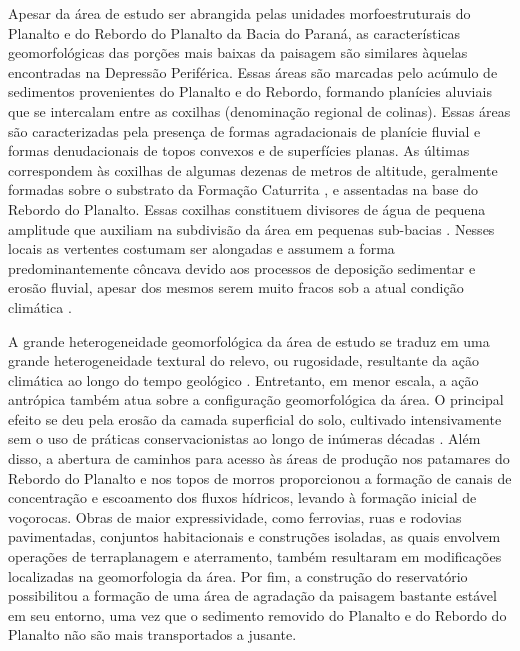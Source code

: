 Apesar da área de estudo ser abrangida pelas unidades morfoestruturais do Planalto e do Rebordo do Planalto
da Bacia do Paraná, as características geomorfológicas das porções mais baixas da paisagem são similares 
àquelas encontradas na Depressão Periférica. Essas áreas são marcadas pelo acúmulo de sedimentos provenientes 
do Planalto e do Rebordo, formando planícies aluviais que se intercalam entre as coxilhas (denominação 
regional de colinas). Essas áreas são caracterizadas pela presença de formas agradacionais de planície fluvial 
e formas denudacionais de topos convexos e de superfícies planas. As últimas correspondem às coxilhas de 
algumas dezenas de metros de altitude, geralmente formadas sobre o substrato da Formação Caturrita 
\cite{GasparettoEtAl1988}, e assentadas na base do Rebordo do Planalto. Essas coxilhas constituem 
divisores de água de pequena amplitude que auxiliam na subdivisão da área em pequenas sub-bacias 
\cite{Marins2004, Sartori2009}. Nesses locais as vertentes costumam ser alongadas e assumem a forma 
predominantemente côncava devido aos processos de deposição sedimentar e erosão fluvial, apesar dos mesmos 
serem muito fracos sob a atual condição climática 
\cite{NascimentoEtAl2010, WerlangEtAl2010}.

A grande heterogeneidade geomorfológica da área de estudo se traduz em uma grande heterogeneidade textural 
do relevo, ou rugosidade, resultante da ação climática ao longo do tempo geológico \cite{NascimentoEtAl2010}. 
Entretanto, em menor escala, a ação antrópica também atua sobre a configuração geomorfológica da área. O 
principal efeito se deu pela erosão da camada superficial do solo, cultivado intensivamente sem o uso de 
práticas conservacionistas ao longo de inúmeras décadas \cite{Menezes2008, Sturmer2008, Miguel2010, 
SamuelRosaEtAl2011a}. Além disso, a abertura de caminhos para acesso às áreas de produção nos patamares do 
Rebordo do Planalto e nos topos de morros proporcionou a formação de canais de concentração e escoamento dos 
fluxos hídricos, levando à formação inicial de voçorocas. Obras de maior expressividade, como ferrovias, ruas 
e rodovias pavimentadas, conjuntos habitacionais e construções isoladas, as quais envolvem operações de 
terraplanagem e aterramento, também resultaram em modificações localizadas na geomorfologia da área. Por fim, 
a construção do reservatório possibilitou a formação de uma área de agradação da paisagem bastante estável em 
seu entorno, uma vez que o sedimento removido do Planalto e do Rebordo do Planalto não são mais transportados 
a jusante.

